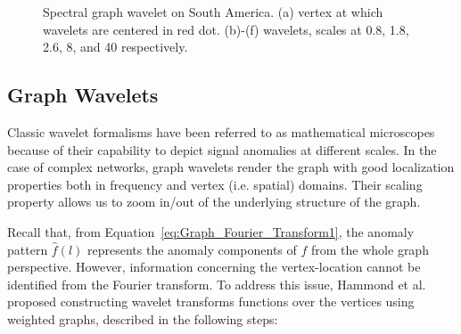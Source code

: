 \begin{figure}[t]
{		\label{fig:brazil5}
	}
	\caption{Spectral graph wavelet on South America. (a) vertex at which wavelets are centered in red dot. (b)-(f) wavelets, scales at 0.8, 1.8, 2.6, 8, and 40 respectively.}
	\label{fig:southamericanscale}
\end{figure}



\subsection{Graph Wavelets}
\label{sec:graph_wavelet}
Classic wavelet formalisms have been referred to as mathematical microscopes because of their capability to depict
signal anomalies at different scales. In the case of complex networks, graph wavelets render the graph with good localization properties both in frequency and vertex (i.e. spatial) domains. Their scaling property allows us to zoom in/out of the underlying structure of the graph.

Recall that, from Equation~\ref{eq:Graph_Fourier_Transform1}, the anomaly pattern $\hat{f}(l)$ represents the anomaly components of $f$ from the whole graph perspective. However, information concerning the vertex-location cannot be identified from the Fourier transform. To address this issue, Hammond et al.~\cite{hammond2011wavelets} proposed constructing wavelet transforms functions over the vertices using weighted graphs, described in the following steps:

